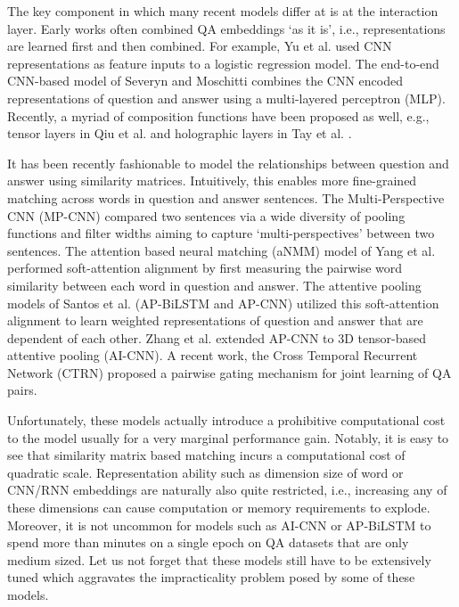 \documentclass[sigconf]{acmart}
\begin{document}
The key component in which many recent models differ at is at the interaction layer. Early works often combined QA embeddings `as it is', i.e., representations are learned first and then combined. For example, Yu et al. \cite{DBLP:journals/corr/YuHBP14} used CNN representations as feature inputs to a logistic regression model. The end-to-end CNN-based model of Severyn and Moschitti \cite{DBLP:conf/sigir/SeverynM15} combines the CNN encoded representations of question and answer using a multi-layered perceptron (MLP). Recently, a myriad of composition functions have been proposed as well, e.g., tensor layers in Qiu et al. \cite{DBLP:conf/ijcai/QiuH15} and holographic layers in Tay et al. \cite{DBLP:conf/sigir/TayPLH17}. 

It has been recently fashionable to model the relationships between question and answer using similarity matrices. Intuitively, this enables more fine-grained matching across words in question and answer sentences. The Multi-Perspective CNN (MP-CNN) \cite{DBLP:conf/emnlp/HeGL15} compared two sentences via a wide diversity of pooling functions and filter widths aiming to capture `multi-perspectives' between two sentences. The attention based neural matching (aNMM) model of Yang et al. \cite{DBLP:conf/cikm/YangAGC16} performed soft-attention alignment by first measuring the pairwise word similarity between each word in question and answer. The attentive pooling models of Santos et al. \cite{DBLP:journals/corr/SantosTXZ16} (AP-BiLSTM and AP-CNN) utilized this soft-attention alignment to learn weighted representations of question and answer that are dependent of each other. Zhang et al. \cite{DBLP:conf/aaai/ZhangLSW17} extended AP-CNN to 3D tensor-based attentive pooling (AI-CNN). A recent work, the Cross Temporal Recurrent Network (CTRN) \cite{1711.07656} proposed a pairwise gating mechanism for joint learning of QA pairs. 

Unfortunately, these models actually introduce a prohibitive computational cost to the model usually for a very marginal performance gain. Notably, it is easy to see that similarity matrix based matching incurs a computational cost of quadratic scale. Representation ability such as dimension size of word or CNN/RNN embeddings are naturally also quite restricted, i.e., increasing any of these dimensions can cause computation or memory requirements to explode. Moreover, it is not uncommon for models such as AI-CNN or AP-BiLSTM to spend more than  minutes on a single epoch on QA datasets that are only medium sized. Let us not forget that these models still have to be extensively tuned which aggravates the impracticality problem posed by some of these models. 
\end{document}
